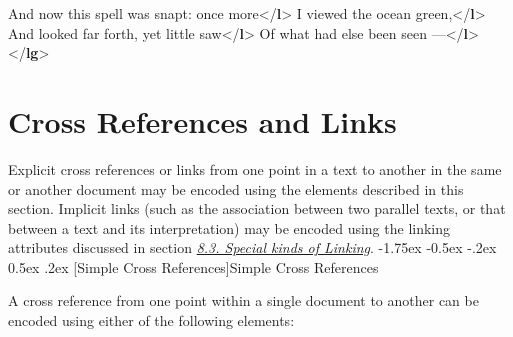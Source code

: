 \documentclass[11pt,twoside]{article}\makeatletter
\makeatletter
\renewcommand\section{\@startsection {section}{1}{\z@}%
     {-1.75ex \@plus -0.5ex \@minus -.2ex}%
     {0.5ex \@plus .2ex}%
     {\reset@font\Large\bfseries\sffamily}}
\renewcommand\subsection{\@startsection{subsection}{2}{\z@}%
     {-1.75ex\@plus -0.5ex \@minus- .2ex}%
     {0.5ex \@plus .2ex}%
     {\reset@font\Large\sffamily}}
\def\DivI{\section}
\def\DivII{\subsection}
\def\DivI{\chapter}
\def\DivII{\section}
\makeatother
\begin{document}
\begin{shaded}
And now this spell was snapt: once more{</\textbf{l}>}\mbox{}\newline 
{}I viewed the ocean green,{</\textbf{l}>}\mbox{}\newline 
{}And looked far forth, yet little saw{</\textbf{l}>}\mbox{}\newline 
{}Of what had else been seen —{</\textbf{l}>}\mbox{}\newline 
{</\textbf{lg}>}\end{shaded}\egroup\par 
\DivI[Cross References and Links]{Cross References and Links}\label{U5-ptrs}\par Explicit cross references or links from one point in a text to
another in the same or  another document may be encoded using the elements
described in this section.   Implicit links (such as
the association between two parallel texts, or that between a text and
its interpretation) may be encoded using the linking attributes
discussed in section \textit{\hyperref[xatts]{8.3. Special kinds of Linking}}.
\DivII[Simple Cross References]{Simple Cross References}\label{ptrs}\par A cross reference from one point within a single document to
another can be encoded using either of the following elements:
\end{document}
